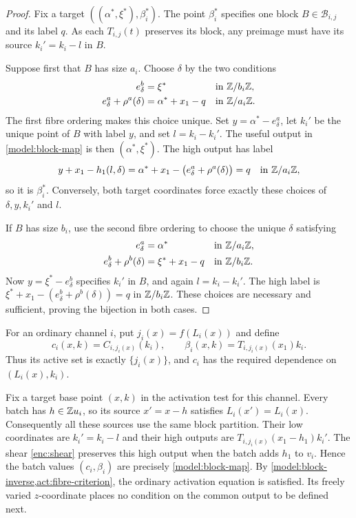 \begin{proof}
Fix a target $((\alpha^*,\xi^*),\beta_i^*)$.
The point $\beta_i^*$ specifies one block $B\in\mathcal B_{i,j}$ and
its label $q$.  As each $T_{i,j}(t)$ preserves its block, any preimage
must have its source $k_i'=k_i-l$ in $B$.

Suppose first that $B$ has size $a_i$.  Choose $\delta$ by the two
conditions
\begin{equation}\label{model:a-inverse}
 \begin{aligned}
 e_\delta^b&=\xi^* &&\text{in }\mathbb Z/b_i\mathbb Z,\\
 e_\delta^a+\rho^a(\delta)&=\alpha^*+x_1-q
       &&\text{in }\mathbb Z/a_i\mathbb Z.
 \end{aligned}
\end{equation}
The first fibre ordering makes this choice unique.  Set
$y=\alpha^*-e_\delta^a$, let $k_i'$ be the unique point of $B$ with
label $y$, and set $l=k_i-k_i'$.  The useful output in
\eqref{model:block-map} is then $(\alpha^*,\xi^*)$.  The high output
has label
\[
 y+x_1-h_1(l,\delta)
 =\alpha^*+x_1-
   \bigl(e_\delta^a+\rho^a(\delta)\bigr)
 =q
 \quad\text{in }\mathbb Z/a_i\mathbb Z,
\]
so it is $\beta_i^*$.  Conversely, both target coordinates force
exactly these choices of $\delta,y,k_i'$ and $l$.

If $B$ has size $b_i$, use the second fibre ordering to choose the
unique $\delta$ satisfying
\begin{equation}\label{model:b-inverse}
 \begin{aligned}
 e_\delta^a&=\alpha^* &&\text{in }\mathbb Z/a_i\mathbb Z,\\
 e_\delta^b+\rho^b(\delta)&=\xi^*+x_1-q
       &&\text{in }\mathbb Z/b_i\mathbb Z.
 \end{aligned}
\end{equation}
Now $y=\xi^*-e_\delta^b$ specifies $k_i'$ in $B$, and again
$l=k_i-k_i'$.  The high label is
$\xi^*+x_1-(e_\delta^b+\rho^b(\delta))=q$ in $\mathbb Z/b_i\mathbb Z$.
These choices are necessary and sufficient, proving the bijection
in both cases.
\end{proof}

For an ordinary channel $i$, put $j_i(x)=f(L_i(x))$ and define
\begin{equation}\label{model:ordinary-outputs}
 c_i(x,k)=C_{i,j_i(x)}(k_i),\qquad
 \beta_i(x,k)=T_{i,j_i(x)}(x_1)k_i.
\end{equation}
Thus its active set is exactly $\{j_i(x)\}$, and $c_i$ has the
required dependence on $(L_i(x),k_i)$.

Fix a target base point $(x,k)$ in the activation test for this
channel.  Every batch has $h\in\mathbb Z u_i$, so its source $x'=x-h$
satisfies $L_i(x')=L_i(x)$.  Consequently all these sources use the
same block partition.  Their low coordinates are $k_i'=k_i-l$ and
their high outputs are
$T_{i,j_i(x)}(x_1-h_1)k_i'$.  The shear
\eqref{enc:shear} preserves this high output when the batch adds
$h_1$ to $v_i$.  Hence the batch values $(c_i,\beta_i)$ are precisely
\eqref{model:block-map}.  By \cref{model:block-inverse,act:fibre-criterion},
the ordinary activation equation is satisfied.  Its freely varied
$z$-coordinate places no condition on the common output to be defined
next.


